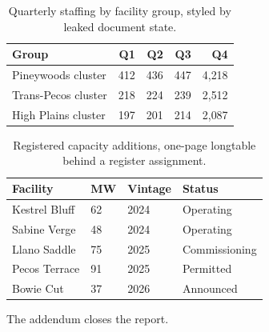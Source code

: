 \documentclass[11pt]{article}
\begin{document}
\begin{table}[htbp]
\centering
\caption{Quarterly staffing by facility group, styled by leaked document
state.\label{tab:leaked}}
\begin{tabular}{lrrrr}
\toprule
Group & Q1 & Q2 & Q3 & Q4 \\
\midrule
Pineywoods cluster & 412 & 436 & 447 & 4{,}218 \\
Trans-Pecos cluster & 218 & 224 & 239 & 2{,}512 \\
High Plains cluster & 197 & 201 & 214 & 2{,}087 \\
\bottomrule
\end{tabular}
\end{table}

\begingroup
\footnotesize
\hfuzz=20pt
\setlength{\tabcolsep}{3pt}
\begin{longtable}{@{}L{3.4cm}C{1.8cm}C{2.0cm}C{2.2cm}@{}}
\caption{Registered capacity additions, one-page longtable behind a
register assignment.\label{tab:register}}\\
\toprule
Facility & MW & Vintage & Status \\
\midrule
\endfirsthead
\bottomrule
\endlastfoot
Kestrel Bluff & 62 & 2024 & Operating \\
Sabine Verge & 48 & 2024 & Operating \\
Llano Saddle & 75 & 2025 & Commissioning \\
Pecos Terrace & 91 & 2025 & Permitted \\
Bowie Cut & 37 & 2026 & Announced \\
\end{longtable}
\endgroup

The addendum closes the report.
\end{document}
